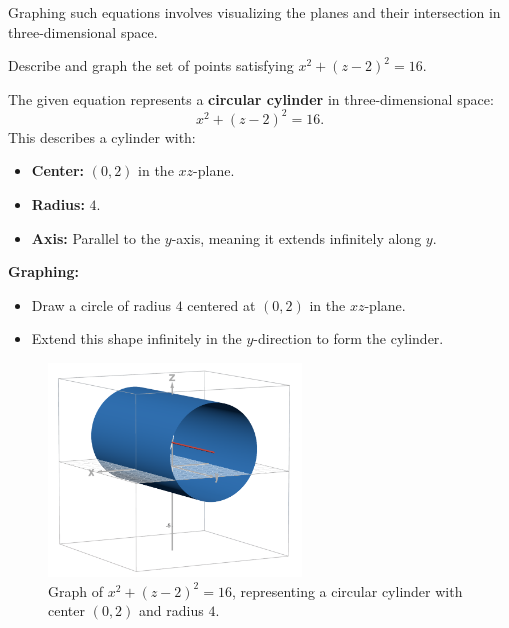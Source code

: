 \documentclass{article}
\begin{document}
\begin{tipbox}
Graphing such equations involves visualizing the planes and their intersection in three-dimensional space.
\end{tipbox}

\begin{examplebox}
    Describe and graph the set of points satisfying \(x^2 + (z - 2)^2 = 16\).

    \begin{solutionbox}
        The given equation represents a \textbf{circular cylinder} in three-dimensional space:
        \[
        x^2 + (z - 2)^2 = 16.
        \]
        This describes a cylinder with:
        \begin{itemize}
            \item \textbf{Center:} \((0,2)\) in the \( xz \)-plane.
            \item \textbf{Radius:} \(4\).
            \item \textbf{Axis:} Parallel to the \( y \)-axis, meaning it extends infinitely along \( y \).
        \end{itemize}

        \textbf{Graphing:}
        \begin{itemize}
            \item Draw a circle of radius \(4\) centered at \( (0,2) \) in the \( xz \)-plane.
            \item Extend this shape infinitely in the \( y \)-direction to form the cylinder.
        \end{itemize}

        \begin{figure}[H]
            \centering
            \includegraphics[width=0.6\textwidth]{x^2+(z-2)^2=16.png}
            \caption{Graph of \( x^2 + (z - 2)^2 = 16 \), representing a circular cylinder with center \((0,2)\) and radius \(4\).}
            \label{fig:circular_cylinder}
        \end{figure}
    \end{solutionbox}
\end{examplebox}
\end{document}
